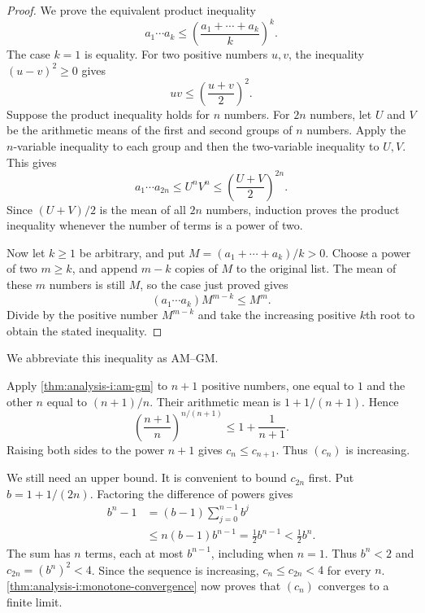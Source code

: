 \begin{proof}
  We prove the equivalent product inequality
  \[
    a_1\cdots a_k\le\left(\frac{a_1+\cdots+a_k}{k}\right)^k.
  \]
  The case $k=1$ is equality. For two positive numbers $u,v$, the
  inequality $(u-v)^2\ge0$ gives
  \[
    uv\le\left(\frac{u+v}{2}\right)^2.
  \]
  Suppose the product inequality holds for $n$ numbers. For $2n$
  numbers, let $U$ and $V$ be the arithmetic means of the first and
  second groups of $n$ numbers. Apply the $n$-variable inequality to
  each group and then the two-variable inequality to $U,V$. This gives
  \[
    a_1\cdots a_{2n}\le U^nV^n
      \le\left(\frac{U+V}{2}\right)^{2n}.
  \]
  Since $(U+V)/2$ is the mean of all $2n$ numbers, induction proves the
  product inequality whenever the number of terms is a power of two.

  Now let $k\ge1$ be arbitrary, and put
  $M=(a_1+\cdots+a_k)/k>0$. Choose a power of two $m\ge k$, and append
  $m-k$ copies of $M$ to the original list. The mean of these $m$
  numbers is still $M$, so the case just proved gives
  \[
    (a_1\cdots a_k)M^{m-k}\le M^m.
  \]
  Divide by the positive number $M^{m-k}$ and take the increasing
  positive $k$th root to obtain the stated inequality.
\end{proof}


We abbreviate this inequality as AM--GM.

\begin{example}
  \label{ex:analysis-i:binomial-sequence-am-gm}
  Apply \autoref{thm:analysis-i:am-gm} to $n+1$ positive numbers,
  one equal to $1$ and the other $n$ equal to $(n+1)/n$.
  Their arithmetic mean is $1+1/(n+1)$. Hence
  \[
    \left(\frac{n+1}{n}\right)^{n/(n+1)}
    \le1+\frac{1}{n+1}.
  \]
  Raising both sides to the power $n+1$ gives $c_n\le c_{n+1}$.
  Thus $(c_n)$ is increasing.

  We still need an upper bound. It is convenient to bound $c_{2n}$
  first. Put $b=1+1/(2n)$. Factoring the difference of powers gives
  \begin{align*}
    b^n-1
      &=(b-1)\sum_{j=0}^{n-1}b^j\\
      &\le n(b-1)b^{n-1}
       =\frac12b^{n-1}<\frac12b^n.
  \end{align*}
  The sum has $n$ terms, each at most $b^{n-1}$, including when $n=1$.
  Thus $b^n<2$ and $c_{2n}=(b^n)^2<4$. Since the sequence is
  increasing, $c_n\le c_{2n}<4$ for every $n$.
  \autoref{thm:analysis-i:monotone-convergence} now proves that $(c_n)$
  converges to a finite limit.
\end{example}

